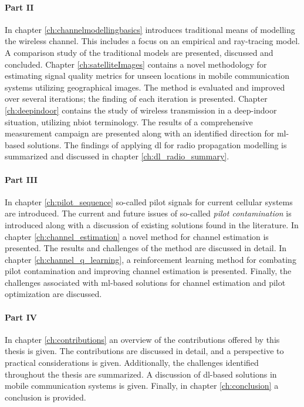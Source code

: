 \paragraph{Part II} In chapter \ref{ch:channelmodellingbasics} introduces traditional means of modelling the wireless channel. This includes a focus on an empirical and ray-tracing model. A comparison study of the traditional models are presented, discussed and concluded. Chapter \ref{ch:satelliteImages} contains a novel methodology for estimating signal quality metrics for unseen locations in mobile communication systems utilizing geographical images. The method is evaluated and improved over several iterations; the finding of each iteration is presented. Chapter \ref{ch:deepindoor} contains the study of wireless transmission in a deep-indoor situation, utilizing \gls{nbiot} terminology. The results of a comprehensive measurement campaign are presented along with an identified direction for \gls{ml}-based solutions.  The findings of applying \gls{dl} for radio propagation modelling is summarized and discussed in chapter \ref{ch:dl_radio_summary}.

\paragraph{Part III} In chapter \ref{ch:pilot_sequence} so-called pilot signals for current cellular systems are introduced. The current and future issues of so-called \emph{pilot contamination} is introduced along with a discussion of existing solutions found in the literature. In chapter \ref{ch:channel_estimation} a novel method for channel estimation is presented. The results and challenges of the method are discussed in detail. In chapter \ref{ch:channel_q_learning}, a reinforcement learning method for combating pilot contamination and improving channel estimation is presented. Finally, the challenges associated with \gls{ml}-based solutions for channel estimation and pilot optimization are discussed. 

\paragraph{Part IV} In chapter \ref{ch:contributions} an overview of the contributions offered by this thesis is given. The contributions are discussed in detail, and a perspective to practical considerations is given. Additionally, the challenges identified throughout the thesis are summarized. A discussion of \gls{dl}-based solutions in mobile communication systems is given. Finally, in chapter \ref{ch:conclusion} a conclusion is provided.




